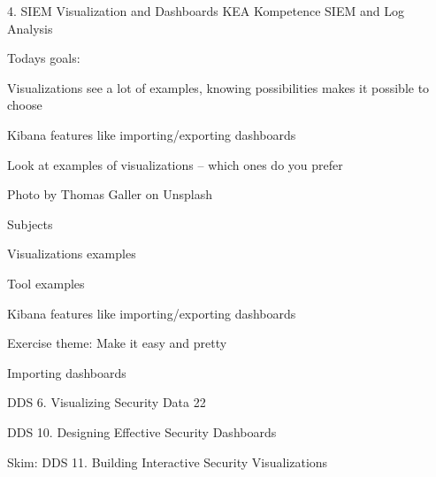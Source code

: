 \documentclass[Screen16to9,17pt]{foils}
\begin{document}
\mytitlepage
{4. SIEM Visualization and Dashboards}
{KEA Kompetence SIEM and Log Analysis}




Todays goals:
\begin{list2}
\item Visualizations see a lot of examples, knowing possibilities makes it possible to choose
\item Kibana features like importing/exporting dashboards
\item Look at examples of visualizations -- which ones do you prefer
\end{list2}

Photo by Thomas Galler on Unsplash



\begin{list1}
\item Subjects
\begin{list2}
\item Visualizations examples
\item Tool examples
\item Kibana features like importing/exporting dashboards
\end{list2}
\item Exercise theme: Make it easy and pretty
\begin{list2}
\item Importing dashboards
\end{list2}
\end{list1}


\begin{list1}
\item DDS 6. Visualizing Security Data 22
\item DDS 10. Designing Effective Security Dashboards
\item Skim: DDS 11. Building Interactive Security Visualizations
\end{list1}




\end{document}
